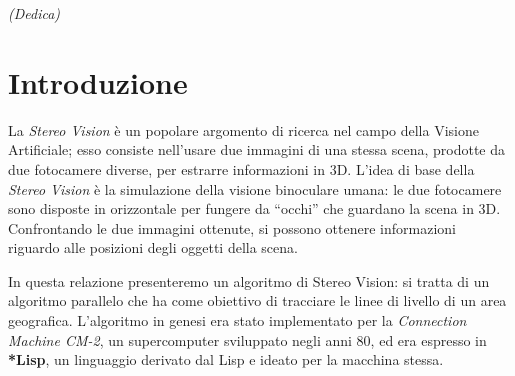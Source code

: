 \documentclass[12pt,a4paper,openright,twoside]{report}
\begin{document}
\clearpage{\pagestyle{empty}\cleardoublepage}

\newpage

\begin{titlepage}
\thispagestyle{empty}
\topmargin=6.5cm
\raggedleft
\large
\em
(Dedica)
\clearpage{\pagestyle{empty}\cleardoublepage}
\end{titlepage}



\tableofcontents
\rhead[\fancyplain{}{\bfseries\leftmark}]{\fancyplain{}{\bfseries\thepage}}
\clearpage{\pagestyle{empty}\cleardoublepage}

\listoffigures
\clearpage{\pagestyle{empty}\cleardoublepage}





\chapter*{Introduzione}



La \textit{Stereo Vision} è un popolare argomento di ricerca nel campo della Visione Artificiale; esso consiste nell'usare due immagini di una stessa scena, prodotte da due fotocamere diverse, per estrarre informazioni in 3D. L'idea di base della \textit{Stereo Vision} è la simulazione della visione binoculare umana: le due fotocamere sono disposte in orizzontale per fungere da ``occhi'' che guardano la scena in 3D. Confrontando le due immagini ottenute, si possono ottenere informazioni riguardo alle posizioni degli oggetti della scena.

In questa relazione presenteremo un algoritmo di Stereo Vision: si tratta di un algoritmo parallelo che ha come obiettivo di tracciare le linee di livello di un area geografica. L'algoritmo in genesi era stato implementato per la \textit{Connection Machine CM-2}, un supercomputer sviluppato negli anni 80, ed era espresso in \textbf{*Lisp}, un linguaggio derivato dal Lisp e ideato per la macchina stessa.
\end{document}

